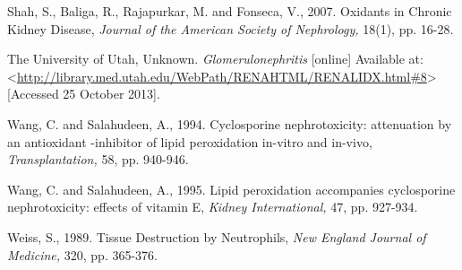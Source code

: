 \documentclass[12pt]{report}
\begin{document}
Shah, S., Baliga, R., Rajapurkar, M. and Fonseca, V., 2007. Oxidants in Chronic Kidney Disease, \textit{Journal of the American Society of Nephrology,} 18(1), pp. 16-28.
\newline
\newline

The University of Utah, Unknown. \textit{Glomerulonephritis} [online] Available at: <\url{http://library.med.utah.edu/WebPath/RENAHTML/RENALIDX.html#8}> [Accessed 25 October 2013].
\newline
\newline

Wang, C. and Salahudeen, A., 1994. Cyclosporine nephrotoxicity: attenuation by an antioxidant -inhibitor of lipid peroxidation in-vitro and in-vivo, \textit{Transplantation,} 58, pp. 940-946.
\newline
\newline

Wang, C. and Salahudeen, A., 1995. Lipid peroxidation accompanies cyclosporine nephrotoxicity: effects of vitamin E, \textit{Kidney International,} 47, pp. 927-934.
\newline
\newline

Weiss, S., 1989. Tissue Destruction by Neutrophils, \textit{New England Journal of Medicine,} 320, pp. 365-376.
\newline
\newline
\end{document}
